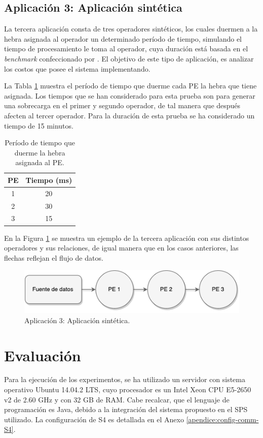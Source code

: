 \subsection{Aplicación 3: Aplicación sintética}
La tercera aplicación consta de tres operadores sintéticos, los cuales duermen a la hebra asignada al operador un determinado período de tiempo, simulando el tiempo de procesamiento le toma al operador, \normalsize{cuya duración está basada en el \textit{benchmark} confeccionado por} \citep{ArasuCGMMRST04}. El objetivo de este tipo de aplicación, es analizar los costos que posee el sistema implementando.

La Tabla \ref{tab:app3-time} muestra el período de tiempo que duerme cada PE \normalsize{la hebra que tiene asignada}. Los tiempos que se han considerado para esta prueba son para generar una sobrecarga en el primer y segundo operador, de tal manera que después afecten al tercer operador. Para la duración de esta prueba se ha considerado un tiempo de 15 minutos.

\begin{table}[!ht]
\centering
\caption{Período de tiempo que duerme la hebra asignada al PE.}
\begin{tabular}{| c | c |}
\hline
PE & Tiempo (ms) \\ \hline
1 & 20 \\
2 & 30 \\
3 & 15 \\\hline
\end{tabular}
\label{tab:app3-time}
\end{table}

En la Figura \ref{fig:terceraAplicacion} se muestra un ejemplo de la tercera aplicación con sus distintos operadores y sus relaciones, de igual manera que en los casos anteriores, las flechas reflejan el flujo de datos.

\begin{figure}[!ht]
	\centering
		\includegraphics[scale=0.6]{images/App3.pdf}
	\caption{Aplicación 3: Aplicación sintética.}
	\label{fig:terceraAplicacion}
\end{figure}

\section{Evaluación}
Para la ejecución de los experimentos, se ha utilizado un servidor con sistema operativo Ubuntu 14.04.2 LTS, cuyo procesador es un Intel Xeon CPU E5-2650 v2 de 2.60 GHz y con 32 GB de RAM. Cabe recalcar, que el lenguaje de programación es Java, debido a la integración del sistema propuesto en el SPS utilizado. La configuración de S4 es detallada en el Anexo \ref{apendice:config-comm-S4}.

